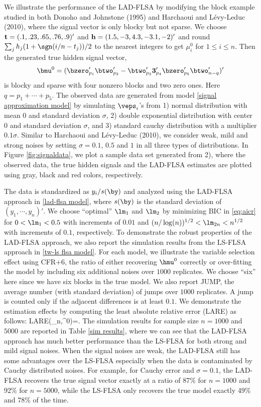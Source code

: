 \documentclass[12pt]{article}
\begin{document}
 We illustrate the performance of the LAD-FLSA
 by modifying the block example studied in both Donoho and Johnstone (1995) and  Harchaoui and L\'{e}vy-Leduc (2010),
 where the signal vector is only blocky but not sparse.
We choose ${\bf t}=(.1, .23, .65, .76, .9)'$ and ${\bf h}=(1.5,    -3,   4.3, -3.1,  -2)'$
and round $\sum_j h_j(1 + \sgn (i/n-t_j))/2$
to the nearest integers to get $\mu_i^0$ for $1\le i\le n$.
Then the generated true hidden signal vector,
$$\bmu^0=(\bzero_{p_1}' \btwo_{p_2}' -\btwo_{p_3}' {\bf 3}_{p_4}' \bzero_{p_5}' \btwo'_{n-q})'$$
is blocky and sparse with four nonzero blocks and two zero ones. Here $q=p_1+\cdots+ p_5$.
The observed data are generated from model \eqref{signal approximation model} by
simulating
$\veps_i$'s from 1) normal distribution with mean $0$ and standard deviation $\sigma$,
2) double exponential distribution with center $0$
and standard deviation $\sigma$, %
and 3) standard cauchy distribution
with a multiplier $0.1\sigma$.
 Similar to  Harchaoui and L\'{e}vy-Leduc (2010), we consider
weak, mild and strong noises by setting $\sigma=0.1$, $0.5$ and $1$ in all
three types of distributions.
In Figure \ref{fig:signaldata}, we plot
a sample data set generated from 2),
where the observed data, the true hidden signals and the
LAD-FLSA estimates are plotted using gray, black and red colors, respectively.

The data is standardized as $y_i/s(\by)$ and analyzed  using
the LAD-FLSA approach in \eqref{lad-flsa model}, where $s(\by)$ is
the standard deviation of $(y_1,\cdots,y_n)'$.
We choose ``optimal'' $\lm_1$ and $\lm_2$ by minimizing  BIC in \eqref{eq:aicr}
 for $0<\lm_1<0.5$  with
increments of $0.01$ and  $(n/\log(n))^{1/2}<\lm_{2n}<n^{1/2}$ with
increments of $0.1$, respectively.
To demonstrate the robust properties  of the LAD-FLSA approach,
we also report the simulation results from
the LS-FLSA  approach in \eqref{tw-ls flsa model}.
For each model, we illustrate the variable selection effect using CFR+6,
 the ratio of either recovering $\hmu^0$ correctly or
 over-fitting the model by including six additional noises
  over $1000$ replicates.
  We choose ``six'' here since we have six blocks in
the true model.
We also report JUMP, the average number (with standard deviation) of
jumps over $1000$ replicates. A jump is counted only if
the adjacent differences is at least $0.1$.
We demonstrate the estimation effects by computing the least absolute relative error (LARE)
as follows:
{\rm LARE}(\hbmu_n,\bmu^0)=.
\eel
The simulation results for sample size $n=1000$ and $5000$ are reported
in Table \ref{sim results}, where we can see that
the LAD-FLSA approach has much better performance than the
LS-FLSA for both strong and mild signal noises.
When the signal noises are weak, the LAD-FLSA still has some advantages over
the LS-FLSA especially when the data is contaminated by Cauchy distributed noises. For example,
for Cauchy error and $\sigma=0.1$,
the LAD-FLSA recovers the true signal vector exactly at a ratio of 87\% for $n=1000$ and  92\%
for $n=5000$, while
the LS-FLSA only recovers the true model exactly 49\% and 78\% of the time.
\end{document}
